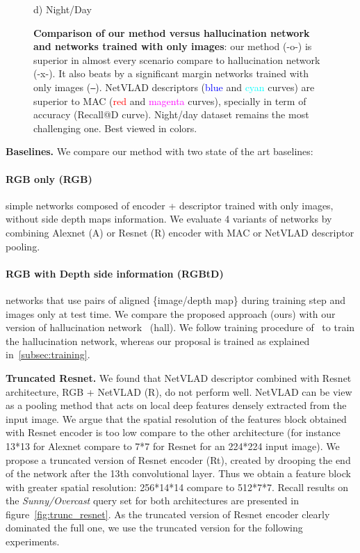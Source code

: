 \begin{figure}
\begin{minipage}{0.85\linewidth}
\begin{minipage}{0.49\linewidth}
		{\scriptsize d) Night/Day}
	\end{minipage}
	
	\end{minipage}

	\caption{\label{fig:results} \textbf{Comparison of our method versus hallucination network and networks trained with only images}: our method (-o-) is superior in almost every scenario compare to hallucination network (-x-). It also beats by a significant margin networks trained with only images (\texttt{--}). NetVLAD descriptors (\textcolor{blue}{blue} and \textcolor{cyan}{cyan} curves) are superior to MAC (\textcolor{red}{red} and \textcolor{magenta}{magenta} curves), specially in term of accuracy (Recall@D curve). Night/day dataset remains the most challenging one. Best viewed in colors.}
\end{figure}

\noindent\textbf{Baselines.} We compare our method with two state of the art baselines:
    \paragraph{RGB only (\textbf{RGB})} simple networks composed of encoder + descriptor trained with only images, without side depth maps information. We evaluate 4 variants of networks by combining Alexnet (A) or Resnet (R) encoder with MAC or NetVLAD descriptor pooling.
    \paragraph{RGB with Depth side information (\textbf{RGBtD})} networks that use pairs of aligned \{image/depth map\} during training step and images only at test time. We compare the proposed approach (ours) with our version of hallucination network~\cite{Hoffman2016} (hall). We follow training procedure of~\cite{Hoffman2016} to train the hallucination network, whereas our proposal is trained as explained in~\ref{subsec:training}. 

\vspace{4pt}\noindent\textbf{Truncated Resnet.} We found that NetVLAD descriptor combined with Resnet architecture, RGB + NetVLAD (R), do not perform well. NetVLAD can be view as a pooling method that acts on local deep features densely extracted from the input image. We argue that the spatial resolution of the features block obtained with Resnet encoder is too low compare to the other architecture (for instance 13*13 for Alexnet compare to 7*7 for Resnet for an 224*224 input image). We propose a truncated version of Resnet encoder (Rt), created by drooping the end of the network after the 13th convolutional layer. Thus we obtain a feature block with greater spatial resolution: 256*14*14 compare to 512*7*7. Recall results on the \textit{Sunny/Overcast} query set for both architectures are presented in figure~\ref{fig:trunc_resnet}. As the truncated version of Resnet encoder clearly dominated the full one, we use the truncated version for the following experiments.

